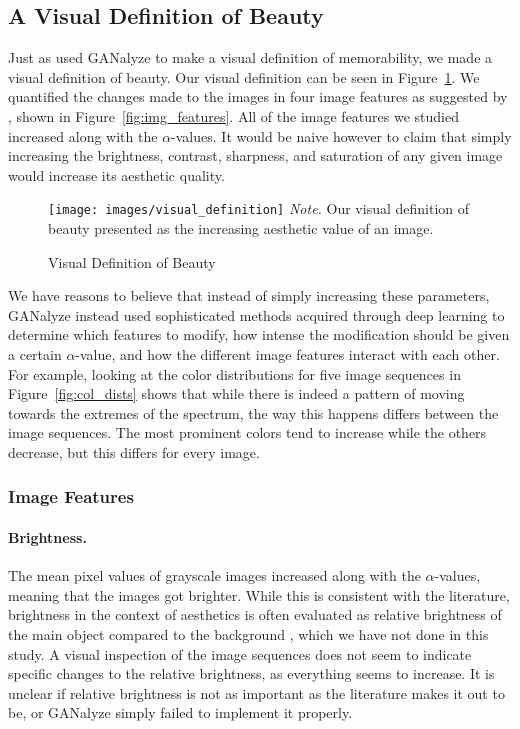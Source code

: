 \documentclass[../main.tex]{subfiles}
\begin{document}
\subsection{A Visual Definition of Beauty}
Just as \textcite{goetschalckxGANalyzeVisualDefinitions2019} used GANalyze to make a visual definition of memorability, we made a visual definition of beauty. Our visual definition can be seen in Figure~\ref{img:visual_def}. We quantified the changes made to the images in four image features as suggested by \textcite{ke2006design}, shown in Figure~\ref{fig:img_features}. All of the image features we studied increased along with the $\alpha$-values. It would be naive however to claim that simply increasing the brightness, contrast, sharpness, and saturation of any given image would increase its aesthetic quality.

\begin{figure}[!ht]
	\caption{Visual Definition of Beauty}
	\label{img:visual_def}
	\texttt{[image: images/visual\_definition]}
	{\textit{Note.} Our visual definition of beauty presented as the increasing aesthetic value of an image.}
\end{figure}

We have reasons to believe that instead of simply increasing these parameters, GANalyze instead used sophisticated methods acquired through deep learning to determine which features to modify, how intense the modification should be given a certain $\alpha$-value, and how the different image features interact with each other. For example, looking at the color distributions for five image sequences in Figure~\ref{fig:col_dists} shows that while there is indeed a pattern of moving towards the extremes of the spectrum, the way this happens differs between the image sequences. The most prominent colors tend to increase while the others decrease, but this differs for every image.

\subsubsection{Image Features}
\paragraph{Brightness.} The mean pixel values of grayscale images increased along with the $\alpha$-values, meaning that the images got brighter. While this is consistent with the literature, brightness in the context of aesthetics is often evaluated as relative brightness of the main object compared to the background \parencite{ke2006design, obrador2010role}, which we have not done in this study. A visual inspection of the image sequences does not seem to indicate specific changes to the relative brightness, as everything seems to increase. It is unclear if relative brightness is not as important as the literature makes it out to be, or GANalyze simply failed to implement it properly.
\end{document}

